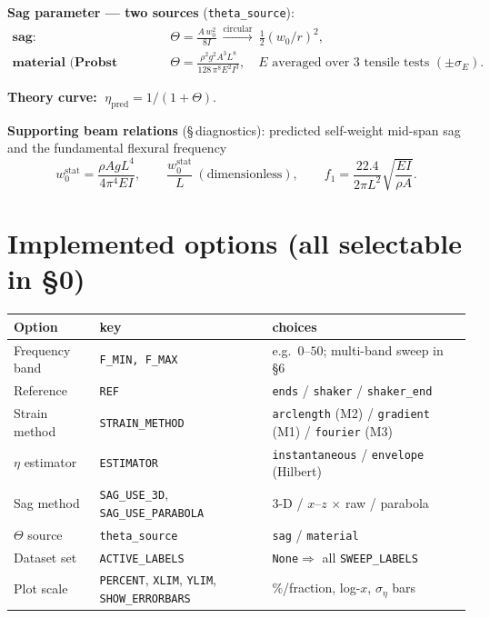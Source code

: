 \documentclass[11pt,a4paper]{article}
\begin{document}
\textbf{Sag parameter --- two sources} (\texttt{theta\_source}):
\begin{align}
\textbf{sag:}\quad &\Theta=\frac{A\,w_0^2}{8I}\ \xrightarrow{\text{circular}}\ \tfrac12(w_0/r)^2,\\
\textbf{material (Probst Eq.~14):}\quad &\Theta=\frac{\rho^2 g^2 A^3 L^8}{128\,\pi^8 E^2 I^3},
\quad\text{$E$ averaged over 3 tensile tests }(\pm\sigma_E).
\end{align}

\textbf{Theory curve:}
$\;\boxed{\eta_{\mathrm{pred}}=1/(1+\Theta)}$.

\textbf{Supporting beam relations} (\S\,diagnostics): predicted self-weight mid-span sag and the
fundamental flexural frequency
\begin{equation}
w_0^{\mathrm{stat}}=\frac{\rho A g L^4}{4\pi^4 E I},\qquad
\frac{w_0^{\mathrm{stat}}}{L}\ (\text{dimensionless}),\qquad
f_1=\frac{22.4}{2\pi L^2}\sqrt{\frac{EI}{\rho A}}.
\end{equation}

\section*{Implemented options (all selectable in \S0)}
\begin{table}[h]\centering\footnotesize
\begin{tabular}{@{}lll@{}}
\toprule
\textbf{Option} & \textbf{key} & \textbf{choices}\\\midrule
Frequency band & \texttt{F\_MIN, F\_MAX} & e.g.\ $0$--$50$; multi-band sweep in \S6\\
Reference & \texttt{REF} & \texttt{ends} / \texttt{shaker} / \texttt{shaker\_end}\\
Strain method & \texttt{STRAIN\_METHOD} & \texttt{arclength} (M2) / \texttt{gradient} (M1) / \texttt{fourier} (M3)\\
$\eta$ estimator & \texttt{ESTIMATOR} & \texttt{instantaneous} / \texttt{envelope} (Hilbert)\\
Sag method & \texttt{SAG\_USE\_3D}, \texttt{SAG\_USE\_PARABOLA} & 3-D / $x$--$z$ $\times$ raw / parabola\\
$\Theta$ source & \texttt{theta\_source} & \texttt{sag} / \texttt{material}\\
Dataset set & \texttt{ACTIVE\_LABELS} & \texttt{None}$\Rightarrow$ all \texttt{SWEEP\_LABELS}\\
Plot scale & \texttt{PERCENT}, \texttt{XLIM}, \texttt{YLIM}, \texttt{SHOW\_ERRORBARS} & \%/fraction, log-$x$, $\sigma_\eta$ bars\\
\bottomrule
\end{tabular}
\end{table}
\end{document}
